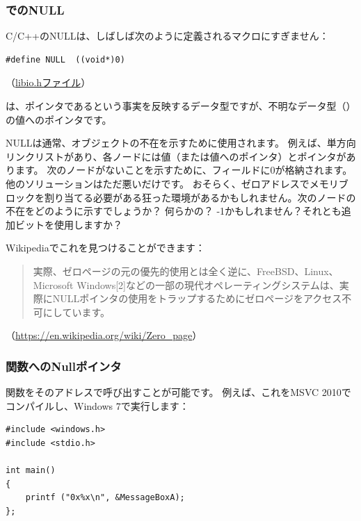 \subsubsection{\CCpp でのNULL}

C/C++のNULLは、しばしば次のように定義されるマクロにすぎません：

\begin{lstlisting}[style=customc]
#define NULL  ((void*)0)
\end{lstlisting}
（\href{https://github.com/wzhy90/linaro_toolchains/blob/8ff8ae680bac04558d10cc9626e12c4c2f6c1348/arm-cortex_a15-linux-gnueabihf/libc/usr/include/libio.h#L70}{libio.hファイル}）

は、ポインタであるという事実を反映するデータ型ですが、不明なデータ型（）の値へのポインタです。

NULLは通常、オブジェクトの不在を示すために使用されます。
例えば、単方向リンクリストがあり、各ノードには値（または値へのポインタ）とポインタがあります。
次のノードがないことを示すために、フィールドに0が格納されます。
他のソリューションはただ悪いだけです。
おそらく、ゼロアドレスでメモリブロックを割り当てる必要がある狂った環境があるかもしれません。次のノードの不在をどのように示すでしょうか？
何らかの？ -1かもしれません？それとも追加ビットを使用しますか？

Wikipediaでこれを見つけることができます：

\begin{framed}
\begin{quotation}
実際、ゼロページの元の優先的使用とは全く逆に、FreeBSD、Linux、Microsoft Windows[2]などの一部の現代オペレーティングシステムは、実際にNULLポインタの使用をトラップするためにゼロページをアクセス不可にしています。
\end{quotation}
\end{framed}
（\url{https://en.wikipedia.org/wiki/Zero_page}）

\subsubsection{関数へのNullポインタ}

関数をそのアドレスで呼び出すことが可能です。
例えば、これをMSVC 2010でコンパイルし、Windows 7で実行します：

\begin{lstlisting}[style=customc]
#include <windows.h>
#include <stdio.h>

int main()
{
	printf ("0x%x\n", &MessageBoxA);
};
\end{lstlisting}


